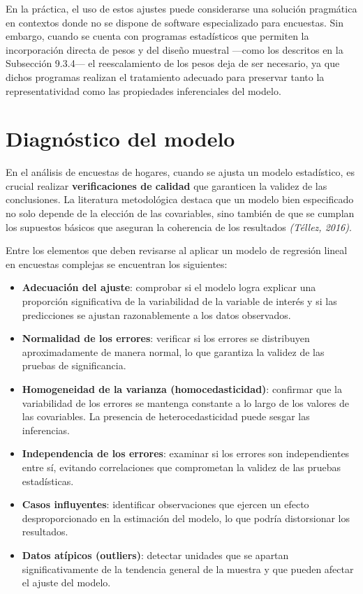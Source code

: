 \documentclass[
  spanish,
  12pt,
]{book}
\providecommand{\tightlist}{%
  \setlength{\itemsep}{0pt}\setlength{\parskip}{0pt}}
\begin{document}
En la práctica, el uso de estos ajustes puede considerarse una solución pragmática en contextos donde no se dispone de software especializado para encuestas. Sin embargo, cuando se cuenta con programas estadísticos que permiten la incorporación directa de pesos y del diseño muestral ---como los descritos en la Subsección 9.3.4--- el reescalamiento de los pesos deja de ser necesario, ya que dichos programas realizan el tratamiento adecuado para preservar tanto la representatividad como las propiedades inferenciales del modelo.

\section{Diagnóstico del modelo}\label{diagnuxf3stico-del-modelo}

En el análisis de encuestas de hogares, cuando se ajusta un modelo estadístico, es crucial realizar \textbf{verificaciones de calidad} que garanticen la validez de las conclusiones. La literatura metodológica destaca que un modelo bien especificado no solo depende de la elección de las covariables, sino también de que se cumplan los supuestos básicos que aseguran la coherencia de los resultados \emph{(Téllez, 2016)}.

Entre los elementos que deben revisarse al aplicar un modelo de regresión lineal en encuestas complejas se encuentran los siguientes:

\begin{itemize}
\tightlist
\item
  \textbf{Adecuación del ajuste}: comprobar si el modelo logra explicar una proporción significativa de la variabilidad de la variable de interés y si las predicciones se ajustan razonablemente a los datos observados.
\item
  \textbf{Normalidad de los errores}: verificar si los errores se distribuyen aproximadamente de manera normal, lo que garantiza la validez de las pruebas de significancia.
\item
  \textbf{Homogeneidad de la varianza (homocedasticidad)}: confirmar que la variabilidad de los errores se mantenga constante a lo largo de los valores de las covariables. La presencia de heterocedasticidad puede sesgar las inferencias.
\item
  \textbf{Independencia de los errores}: examinar si los errores son independientes entre sí, evitando correlaciones que comprometan la validez de las pruebas estadísticas.
\item
  \textbf{Casos influyentes}: identificar observaciones que ejercen un efecto desproporcionado en la estimación del modelo, lo que podría distorsionar los resultados.
\item
  \textbf{Datos atípicos (outliers)}: detectar unidades que se apartan significativamente de la tendencia general de la muestra y que pueden afectar el ajuste del modelo.
\end{itemize}
\end{document}
